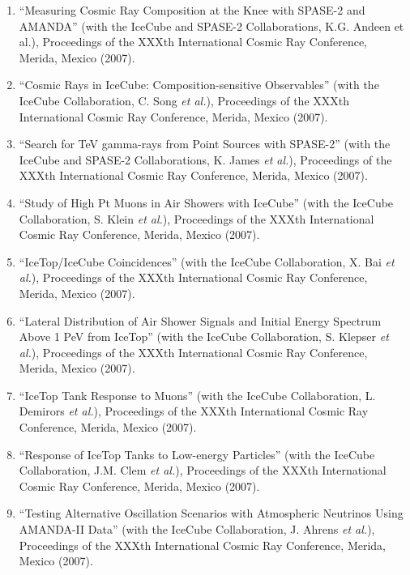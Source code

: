 \begin{enumerate}
\item ``Measuring Cosmic Ray Composition at the Knee with
        SPASE-2 and   AMANDA'' (with the IceCube and SPASE-2
        Collaborations, K.G. Andeen et   al.), Proceedings
        of the XXXth International Cosmic Ray Conference,
        Merida, Mexico (2007).

\item ``Cosmic Rays in IceCube: Composition-sensitive
        Observables'' (with   the IceCube Collaboration, C.
        Song {\it et al.}), Proceedings of the XXXth
        International Cosmic Ray Conference, Merida, Mexico
        (2007).

\item ``Search for TeV gamma-rays from Point Sources with
        SPASE-2'' (with   the IceCube and SPASE-2
        Collaborations, K. James {\it et al.}),
        Proceedings of the XXXth International Cosmic Ray
        Conference,   Merida, Mexico (2007).

\item ``Study of High Pt Muons in Air Showers with IceCube''
        (with the   IceCube Collaboration, S. Klein {\it et
        al.}), Proceedings of the XXXth   International
        Cosmic Ray Conference, Merida, Mexico (2007).

\item ``IceTop/IceCube Coincidences'' (with the IceCube
        Collaboration,   X. Bai {\it et al.}), Proceedings
        of the XXXth International Cosmic Ray   Conference,
        Merida, Mexico (2007).

\item ``Lateral Distribution of Air Shower Signals and
        Initial Energy   Spectrum Above 1 PeV from IceTop''
        (with the IceCube Collaboration,   S. Klepser {\it
        et al.}), Proceedings of the XXXth International
        Cosmic   Ray Conference, Merida, Mexico (2007).

\item ``IceTop Tank Response to Muons'' (with the IceCube
        Collaboration,   L. Demirors {\it et al.}),
        Proceedings of the XXXth International Cosmic   Ray
        Conference, Merida, Mexico (2007).

\item ``Response of IceTop Tanks to Low-energy Particles''
        (with the   IceCube Collaboration, J.M. Clem {\it et
        al.}), Proceedings of the XXXth   International
        Cosmic Ray Conference, Merida, Mexico (2007).

\item ``Testing Alternative Oscillation Scenarios with
        Atmospheric   Neutrinos Using AMANDA-II Data'' (with
        the IceCube Collaboration,   J. Ahrens {\it et
        al.}), Proceedings of the XXXth International Cosmic
        Ray   Conference, Merida, Mexico (2007).


\end{enumerate}
